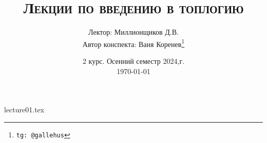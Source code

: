 \documentclass[a4paper]{article}
\title{\scshape {Лекции по введению в топлогию}}
\date{2 курс. Осенний семестр 2024,г. \\ \today}
\author{Лектор: Миллионщиков Д.В. \\ Автор конспекта: Ваня Коренев\thanks{\texttt{tg: @gallehus}}}
\begin{document}
\maketitle
\newpage
\tableofcontents

\newpage

{lecture01.tex}
\end{document}
